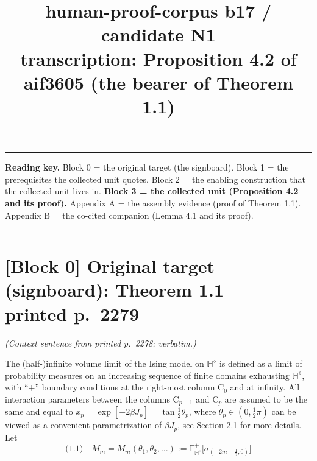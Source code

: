 \documentclass[11pt]{article}
\title{human-proof-corpus b17 / candidate N1\\[2pt]
\large transcription: Proposition 4.2 of aif3605 (the bearer of Theorem 1.1)}
\date{}
\newcommand{\eql}[1]{\text{(#1)}\quad}
\newcommand{\bHd}{\mathbb{H}^{\diamond}}
\begin{document}
\maketitle
\vspace{-3em}

\noindent\rule{\textwidth}{0.4pt}
\noindent\textbf{Reading key.} Block 0 = the original target (the signboard).
Block 1 = the prerequisites the collected unit quotes. Block 2 = the
enabling construction that the collected unit lives in. \textbf{Block 3 = the
collected unit (Proposition 4.2 and its proof).} Appendix A = the
assembly evidence (proof of Theorem 1.1). Appendix B = the co-cited
companion (Lemma 4.1 and its proof).
\noindent\rule{\textwidth}{0.4pt}

\section*{[Block 0] Original target (signboard): Theorem 1.1 --- printed p.~2279}

\noindent\emph{(Context sentence from printed p.~2278; verbatim.)}

The (half-)infinite volume limit of the Ising model on $\bHd$ is defined as a
limit of probability measures on an increasing sequence of finite domains
exhausting $\bHd$, with ``$+$'' boundary conditions at the right-most column
$\mathrm{C}_0$ and at infinity. All interaction parameters between the
columns $\mathrm{C}_{p-1}$ and $\mathrm{C}_p$ are assumed to be the same and
equal to $x_p = \exp[-2\beta J_p] = \tan\frac12\theta_p$, where
$\theta_p \in (0,\frac12\pi)$ can be viewed as a convenient parametrization of
$\beta J_p$, see Section 2.1 for more details. Let
\[
\eql{1.1} M_m = M_m(\theta_1,\theta_2,\dots) := \mathbb{E}^{+}_{\bHd}\bigl[\sigma_{(-2m-\frac12,0)}\bigr]
\]
\end{document}

